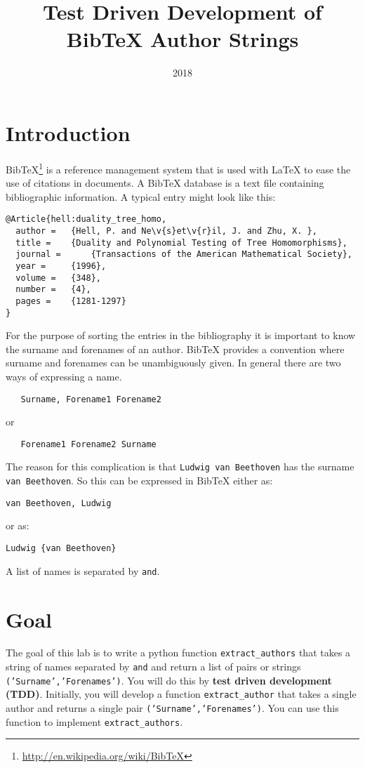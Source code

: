 \documentclass[10pt]{paper}
\title{Test Driven Development of Bib\TeX{} Author Strings}
\date{2018}
\begin{document}
\maketitle
\section*{Introduction}
Bib\TeX\footnote{\url{http://en.wikipedia.org/wiki/BibTeX}} is a
reference management system that is used with La\TeX{} to ease the use
of citations in documents. A Bib\TeX{} database is a text file
containing bibliographic information. A typical entry might look like this:
\begin{verbatim}
@Article{hell:duality_tree_homo,
  author = 	 {Hell, P. and Ne\v{s}et\v{r}il, J. and Zhu, X. },
  title = 	 {Duality and Polynomial Testing of Tree Homomorphisms},
  journal = 	 {Transactions of the American Mathematical Society},
  year = 	 {1996},
  volume =	 {348},
  number =	 {4},
  pages =	 {1281-1297}
}
\end{verbatim}

For the purpose of sorting the entries in the bibliography it is
important to know the surname and forenames of an author. Bib\TeX{}
provides a convention where surname and forenames can be unambiguously
given. In general there are two ways of expressing a name.
\begin{verbatim}
   Surname, Forename1 Forename2
\end{verbatim}
or
\begin{verbatim}
   Forename1 Forename2 Surname
\end{verbatim}
The reason for this complication is that {\tt Ludwig van Beethoven}
has the surname {\tt van Beethoven}. So this can be expressed in
Bib\TeX{} either as: 
\begin{verbatim}
van Beethoven, Ludwig
\end{verbatim}
or as: 
\begin{verbatim}
Ludwig {van Beethoven}
\end{verbatim}

A list of names is separated by {\tt and}. 

\section*{Goal}
The goal of this lab is to write a python function \texttt
{extract\_authors} that takes a string of names separated by
\texttt{and} and return a list of pairs or strings
\texttt{('Surname','Forenames')}. You will do this by \textbf{test
  driven development (TDD)}.  Initially, you will develop a function
\texttt{extract\_author} that takes a single author and returns a
single pair \texttt{('Surname','Forenames')}.  You can use this
function to implement \texttt{extract\_authors}.
\end{document}
